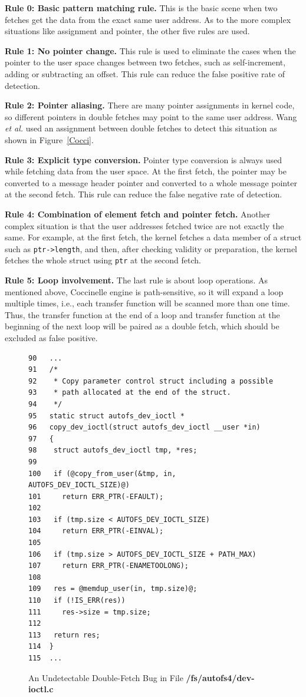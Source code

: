 \documentclass[10pt]{llncs}
\begin{document}
\textbf{Rule 0: Basic pattern matching rule.}
This is the basic scene when two fetches get the data from the exact same user address. As to the more complex situations like assignment and pointer, the other five rules are used.

\textbf{Rule 1: No pointer change.}
This rule is used to eliminate the cases when the pointer to the user space changes between two fetches, such as self-increment, adding or subtracting an offset. This rule can reduce the false positive rate of detection.

\textbf{Rule 2: Pointer aliasing.}
There are many pointer assignments in kernel code, so different pointers in double fetches may point to the same user address. Wang \textit{et al.} used an assignment between double fetches to detect this situation as shown in Figure~\ref{Cocci}.

\textbf{Rule 3: Explicit type conversion.}
Pointer type conversion is always used while fetching data from the user space. At the first fetch, the pointer may be converted to a message header pointer and converted to a whole message pointer at the second fetch. This rule can reduce the false negative rate of detection.

\textbf{Rule 4: Combination of element fetch and pointer fetch.}
Another complex situation is that the user addresses fetched twice are not exactly the same. For example, at the first fetch, the kernel fetches a data member of a struct such as \verb:ptr->length:, and then, after checking validity or preparation, the kernel fetches the whole struct using \verb:ptr: at the second fetch.

\textbf{Rule 5: Loop involvement.}
The last rule is about loop operations. As mentioned above, Coccinelle engine is path-sensitive, so it will expand a loop multiple times, i.e., each transfer function will be scanned more than one time. Thus, the transfer function at the end of a loop and transfer function at the beginning of the next loop will be paired as a double fetch, which should be excluded as false positive.




\begin{figure}[t]
  \centering
\begin{lstlisting}[style=code]
90   ...
91   /*
92    * Copy parameter control struct including a possible
93    * path allocated at the end of the struct.
94    */
95   static struct autofs_dev_ioctl *
96   copy_dev_ioctl(struct autofs_dev_ioctl __user *in)
97   {
98    struct autofs_dev_ioctl tmp, *res;
99   
100   if (@copy_from_user(&tmp, in, AUTOFS_DEV_IOCTL_SIZE)@)
101     return ERR_PTR(-EFAULT);
102  
103   if (tmp.size < AUTOFS_DEV_IOCTL_SIZE)
104     return ERR_PTR(-EINVAL);
105  
106   if (tmp.size > AUTOFS_DEV_IOCTL_SIZE + PATH_MAX)
107     return ERR_PTR(-ENAMETOOLONG);
108  
109   res = @memdup_user(in, tmp.size)@;
110   if (!IS_ERR(res))
111     res->size = tmp.size;
112  
113   return res;
114  }   
115  ...
\end{lstlisting}
  \caption{An Undetectable Double-Fetch Bug in File \textbf{/fs/autofs4/dev-ioctl.c}}
  \label{dev-ioctl}
\end{figure}
\end{document}
